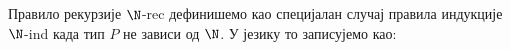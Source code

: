 Правило рекурзије $\N$-rec дефинишемо као специјалан случај правила индукције $\N$-ind када тип $P$ не зависи од $\N$. У језику  то записујемо као:
\begin{code}%
\>[0]%
\>[1761I]\AgdaSymbol{:}\AgdaSpace{}%
\AgdaSymbol{(}\AgdaSpace{}%
\AgdaSymbol{:}\AgdaSpace{}%
\AgdaSpace{}%
\AgdaSpace{}%
\AgdaSymbol{)}\<%
\\
\>[.][@{}l@{}]\<[1761I]%
\>[12]\AgdaSpace{}%
\<%
\\
%
\>[12]\AgdaSpace{}%
\AgdaSymbol{(}\AgdaSpace{}%
\AgdaSpace{}%
\AgdaSpace{}%
\AgdaSpace{}%
\AgdaSymbol{)}\<%
\\
%
\>[12]\AgdaSpace{}%
\AgdaSpace{}%
\AgdaSpace{}%
\<%
\\
\>[0]\AgdaSpace{}%
\AgdaSpace{}%
\AgdaSymbol{=}\AgdaSpace{}%
\AgdaSpace{}%
\AgdaSpace{}%
\AgdaBound{\AgdaUnderscore{}}\AgdaSpace{}%
\AgdaSpace{}%
\AgdaSymbol{)}\<%
\end{code}

